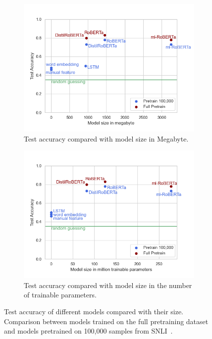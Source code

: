 \documentclass[acmsmall,nonacm]{acmart}
\begin{document}
\begin{figure}[!h]
  \begin{subfigure}[b]{0.48\textwidth}
    \includegraphics[width=\textwidth]{assets/test_accuracy_vs_model_size.png}
    \caption{Test accuracy compared with model size in Megabyte.}
    \label{fig:test_accuracy_vs_model_size_megabyte}
  \end{subfigure}
  \hfill
  \begin{subfigure}[b]{0.48\textwidth}
    \includegraphics[width=\textwidth]{assets/test_accuracy_vs_trainable_parameters.png}
    \caption{Test accuracy compared with model size in the number of trainable parameters.}
    \label{fig:test_accuracy_vs_model_size_parameters}
  \end{subfigure}
  \caption{Test accuracy of different models compared with their size. Comparison between models trained on the full pretraining dataset and models pretrained on 100,000 samples from SNLI~\cite{snli-bowman2015}.}
  \label{fig:test_accuracy_vs_model_size}
\end{figure}
\end{document}
